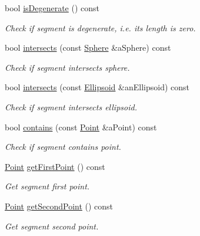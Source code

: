 \begin{DoxyCompactItemize}
bool \hyperlink{classlibrary_1_1math_1_1geom_1_1d3_1_1objects_1_1_segment_a11324bd27db3ef9d931fdee763246759}{is\+Degenerate} () const
\begin{DoxyCompactList}\small\item\em Check if segment is degenerate, i.\+e. its length is zero. \end{DoxyCompactList}\item 
bool \hyperlink{classlibrary_1_1math_1_1geom_1_1d3_1_1objects_1_1_segment_a9919183ce212b474e418685db50891fc}{intersects} (const \hyperlink{classlibrary_1_1math_1_1geom_1_1d3_1_1objects_1_1_sphere}{Sphere} \&a\+Sphere) const
\begin{DoxyCompactList}\small\item\em Check if segment intersects sphere. \end{DoxyCompactList}\item 
bool \hyperlink{classlibrary_1_1math_1_1geom_1_1d3_1_1objects_1_1_segment_af6d7eb00a6886d190c03e8b8e4220f33}{intersects} (const \hyperlink{classlibrary_1_1math_1_1geom_1_1d3_1_1objects_1_1_ellipsoid}{Ellipsoid} \&an\+Ellipsoid) const
\begin{DoxyCompactList}\small\item\em Check if segment intersects ellipsoid. \end{DoxyCompactList}\item 
bool \hyperlink{classlibrary_1_1math_1_1geom_1_1d3_1_1objects_1_1_segment_aabdbcd6bbfbe9350fe53f1b3563b5652}{contains} (const \hyperlink{classlibrary_1_1math_1_1geom_1_1d3_1_1objects_1_1_point}{Point} \&a\+Point) const
\begin{DoxyCompactList}\small\item\em Check if segment contains point. \end{DoxyCompactList}\item 
\hyperlink{classlibrary_1_1math_1_1geom_1_1d3_1_1objects_1_1_point}{Point} \hyperlink{classlibrary_1_1math_1_1geom_1_1d3_1_1objects_1_1_segment_aa51ef3e713b4041f852db4201bbf7821}{get\+First\+Point} () const
\begin{DoxyCompactList}\small\item\em Get segment first point. \end{DoxyCompactList}\item 
\hyperlink{classlibrary_1_1math_1_1geom_1_1d3_1_1objects_1_1_point}{Point} \hyperlink{classlibrary_1_1math_1_1geom_1_1d3_1_1objects_1_1_segment_a5d824fed334185975226d8f7e8489ced}{get\+Second\+Point} () const
\begin{DoxyCompactList}\small\item\em Get segment second point. \end{DoxyCompactList}\item 

\end{DoxyCompactItemize}
